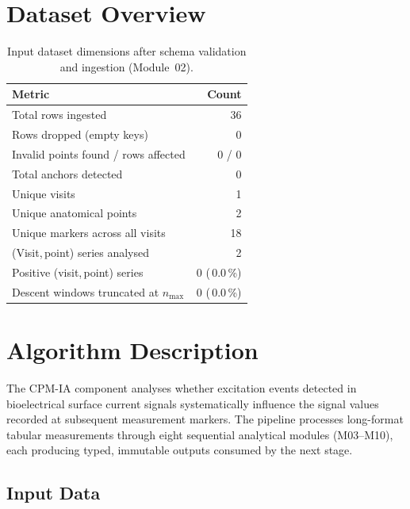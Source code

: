 \documentclass[a4paper,11pt]{article}
\begin{document}
\section{Dataset Overview}

\begin{table}[h!]
\centering
\small
\caption{Input dataset dimensions after schema validation and ingestion (Module~02).}
\begin{tabular}{lr}
\toprule
\textbf{Metric} & \textbf{Count} \\
\midrule
Total rows ingested                        & 36 \\
Rows dropped (empty keys)                  & 0 \\
Invalid points found / rows affected       & 0 / 0 \\
Total anchors detected                     & 0 \\
Unique visits                          & 1 \\
Unique anatomical points               & 2 \\
Unique markers across all visits       & 18 \\
(Visit,\,point) series analysed        & 2 \\
Positive (visit,\,point) series        & 0 (\,0.0\,\%) \\
Descent windows truncated at $n_{\max}$ & 0 (\,0.0\,\%) \\
\bottomrule
\end{tabular}
\end{table}

\section{Algorithm Description}

The CPM-IA component analyses whether excitation events detected in bioelectrical surface
current signals systematically influence the signal values recorded at subsequent measurement
markers. The pipeline processes long-format tabular measurements through eight sequential
analytical modules (M03--M10), each producing typed, immutable outputs consumed by the next
stage.

\subsection{Input Data}
\end{document}

